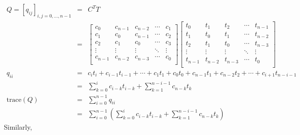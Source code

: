 \documentclass[11pt]{article}
\theoremstyle{definition}
\theoremstyle{remark}
\theoremstyle{plain}
\begin{document}
\begin{eqnarray*}
  Q=\left[q_{ij}\right]_{i,j=0,\dots,n-1}&=&C^TT\\
                                         &=&\left[
                                             \begin{array}{ccccc}
                                               c_0&c_{n-1}&c_{n-2}&\cdots&c_1\\
                                               c_1&c_0&c_{n-1}&\cdots&c_2\\
                                               c_2&c_1&c_0&\cdots&c_3\\
                                               \vdots&\vdots&\vdots&\ddots&\vdots\\
                                               c_{n-1}&c_{n-2}&c_{n-3}&\cdots&c_0\\
                                             \end{array}
  \right]\left[
  \begin{array}{ccccc}
    t_0&t_1&t_2&\cdots&t_{n-1}\\
    t_1&t_0&t_1&\cdots&t_{n-2}\\
    t_2&t_1&t_0&\cdots&t_{n-3}\\
    \vdots&\vdots&\vdots&\ddots&\vdots\\
    t_{n-1}&t_{n-2}&t_{n-3}&\cdots&t_0\\
  \end{array}
  \right]\\
  q_{ii}&=&c_it_i+c_{i-1}t_{i-1}+\cdots+c_1t_1+c_0t_0+c_{n-1}t_1+c_{n-2}t_2+\cdots+c_{i+1}t_{n-i-1}\\
                                         &=&\sum_{k=0}^ic_{i-k}t_{i-k}+\sum_{k=1}^{n-i-1}c_{n-k}t_k\\
  \textrm{trace}\left(Q\right)&=&\sum_{i=0}^{n-1}q_{ii}\\
                                         &=&\sum_{i=0}^{n-1}\left(\sum_{k=0}^ic_{i-k}t_{i-k}+\sum_{k=1}^{n-i-1}c_{n-k}t_k\right)
\end{eqnarray*}
Similarly,
\end{document}
